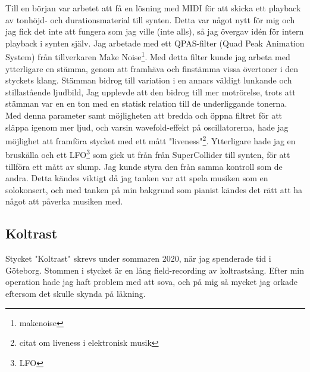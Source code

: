 \documentclass{article}
\begin{document}
		Till en början var arbetet att få en lösning med MIDI för att skicka ett playback av tonhöjd- och
		durationsmaterial till synten. Detta var något nytt för mig och jag fick det inte att fungera som jag
		ville (inte alls), så jag övergav idén för intern playback i synten själv. 
		Jag arbetade med ett QPAS-filter (Quad Peak Animation System) från tillverkaren Make
		Noise\footnote{makenoise}. Med detta filter kunde jag arbeta med ytterligare en stämma, genom att
		framhäva och finstämma vissa övertoner i den styckets klang. Stämman bidrog till variation i en
		annars väldigt lunkande och stillastående ljudbild, Jag upplevde att den bidrog till mer motrörelse,
		trots att stämman var en en ton med en statisk relation till de underliggande tonerna. Med denna
		parameter samt möjligheten att bredda och öppna filtret för att släppa igenom mer ljud, och varsin
		wavefold-effekt på oscillatorerna, hade jag möjlighet att framföra stycket med ett mått
		"liveness"\footnote{citat om liveness i elektronisk musik}. Ytterligare hade jag en bruskälla och ett
		LFO\footnote{LFO} som gick ut från från SuperCollider till synten, för att tillföra ett mått av slump.
		Jag kunde styra den från samma kontroll som de andra. Detta kändes viktigt då jag tanken var att
		spela musiken som en solokonsert, och med tanken på min bakgrund som pianist kändes det rätt att ha
		något att påverka musiken med. 

	\subsection{Koltrast}
	Stycket "Koltrast" skrevs under sommaren 2020, när jag spenderade tid i Göteborg. Stommen i stycket är en
	lång field-recording av koltrastsång. Efter min operation hade jag haft problem med att sova, och
	på mig så mycket jag orkade eftersom det skulle skynda på läkning. 
\end{document}
